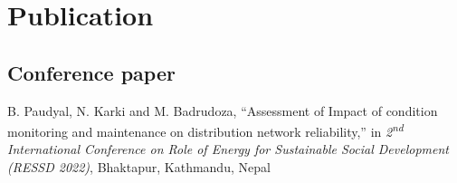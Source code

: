
\chapter*{Publication}
\label{app-publication}
{}

\section*{Conference paper}
B. Paudyal, N. Karki and M. Badrudoza, ``Assessment of Impact of condition monitoring and maintenance on distribution network reliability,'' in \textit{2\textsuperscript{nd} International Conference on Role of Energy for Sustainable Social Development (RESSD 2022)}, Bhaktapur, Kathmandu, Nepal


